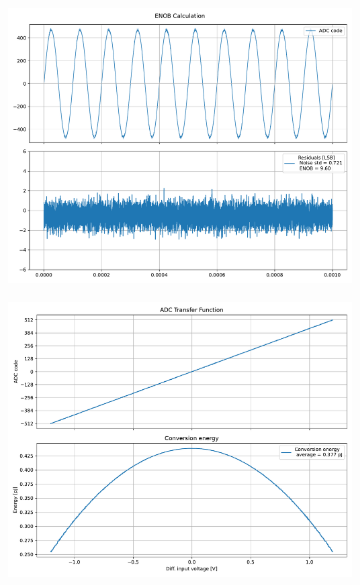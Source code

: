 \documentclass[varwidth]{standalone}
\begin{document}
\begin{figure}
\begin{subfigure}{0.32\textwidth}
    \includegraphics[width=\textwidth]{behavioral_10b_mismatch_binrecomb_enob.pdf}
\end{subfigure}
\begin{subfigure}{0.32\textwidth}
    \begin{table}
    \let\center\empty
    \let\endcenter\relax
    \centering
    \resizebox{0.3\width}{!}{}
    \end{table}
    \includegraphics[width=\textwidth]{behavioral_10b_mismatch_binrecomb_energy.pdf}
\end{subfigure}
\end{figure}
\end{document}
